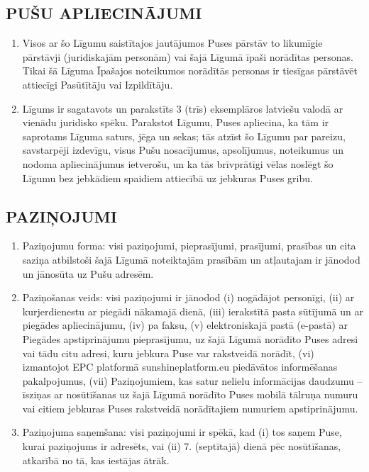 \begin{multicols}{2}
\subsection{PUŠU APLIECINĀJUMI}
\begin{enumerate}
	\item Visos ar šo Līgumu saistītajos jautājumos Puses pārstāv to likumīgie pārstāvji (juridiskajām personām) vai šajā Līgumā īpaši norādītas personas. Tikai šā Līguma Īpašajos noteikumos norādītās personas ir tiesīgas pārstāvēt attiecīgi Pasūtītāju vai Izpildītāju.
	\item Līgums ir sagatavots un parakstīts 3 (trīs) eksemplāros latviešu valodā ar vienādu juridisko spēku. Parakstot Līgumu, Puses apliecina, ka tām ir saprotams Līguma saturs, jēga un sekas; tās atzīst šo Līgumu par pareizu, savstarpēji izdevīgu, visus Pušu nosacījumus, apsolījumus, noteikumus un nodoma apliecinājumus ietverošu, un ka tās brīvprātīgi vēlas noslēgt šo Līgumu bez jebkādiem spaidiem attiecībā uz jebkuras Puses gribu.
\end{enumerate}


\subsection{PAZIŅOJUMI}
\begin{enumerate}
	\item Paziņojumu forma: visi paziņojumi, pieprasījumi, prasījumi, prasības un cita saziņa atbilstoši šajā Līgumā noteiktajām prasībām un atļautajam ir jānodod un jānosūta uz Pušu adresēm.
	\item Paziņošanas veids: visi paziņojumi ir jānodod (i) nogādājot personīgi, (ii) ar kurjerdienestu ar piegādi nākamajā dienā, (iii) ierakstītā pasta sūtījumā un ar piegādes apliecinājumu, (iv) pa faksu, (v) elektroniskajā pastā (e-pastā) ar Piegādes apstiprinājumu pieprasījumu, uz šajā Līgumā norādīto Puses adresi vai tādu citu adresi, kuru jebkura Puse var rakstveidā norādīt, (vi) izmantojot EPC platformā sunshineplatform.eu piedāvātos informēšanas pakalpojumus, (vii) Paziņojumiem, kas satur nelielu informācijas daudzumu – īsziņas ar nosūtīšanas uz šajā Līgumā norādīto Puses mobilā tālruņa numuru vai citiem jebkuras Puses rakstveidā norādītajiem numuriem apstiprinājumu.
	\item Paziņojuma saņemšana: visi paziņojumi ir spēkā, kad (i) tos saņem Puse, kurai paziņojums ir adresēts, vai (ii) 7. (septītajā) dienā pēc nosūtīšanas, atkarībā no tā, kas iestājas ātrāk.
\end{enumerate}

\end{multicols}
